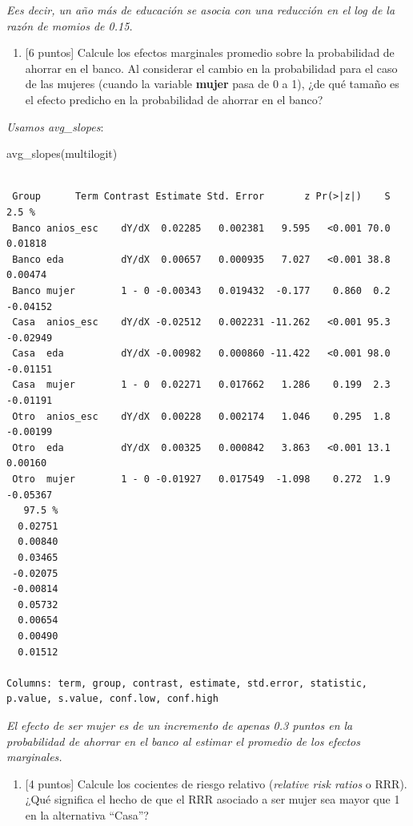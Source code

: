 \documentclass[
  letterpaper,
  DIV=11,
  numbers=noendperiod]{scrartcl}
\newenvironment{Shaded}{\begin{snugshade}}{\end{snugshade}}
\newcommand{\FunctionTok}[1]{\textcolor[rgb]{0.28,0.35,0.67}{#1}}
\newcommand{\NormalTok}[1]{\textcolor[rgb]{0.00,0.23,0.31}{#1}}
\providecommand{\tightlist}{%
  \setlength{\itemsep}{0pt}\setlength{\parskip}{0pt}}\usepackage{longtable,booktabs,array}
\begin{document}
\emph{Ees decir, un año más de educación se asocia con una reducción en
el log de la razón de momios de 0.15.}

\begin{enumerate}
\def\labelenumi{\alph{enumi}.}
\tightlist
\item
  {[}6 puntos{]} Calcule los efectos marginales promedio sobre la
  probabilidad de ahorrar en el banco. Al considerar el cambio en la
  probabilidad para el caso de las mujeres (cuando la variable
  \textbf{mujer} pasa de 0 a 1), ¿de qué tamaño es el efecto predicho en
  la probabilidad de ahorrar en el banco?
\end{enumerate}

\emph{Usamos avg\_slopes}:

\begin{Shaded}
\begin{Highlighting}[]
\FunctionTok{avg\_slopes}\NormalTok{(multilogit)}
\end{Highlighting}
\end{Shaded}

\begin{verbatim}

 Group      Term Contrast Estimate Std. Error       z Pr(>|z|)    S    2.5 %
 Banco anios_esc    dY/dX  0.02285   0.002381   9.595   <0.001 70.0  0.01818
 Banco eda          dY/dX  0.00657   0.000935   7.027   <0.001 38.8  0.00474
 Banco mujer        1 - 0 -0.00343   0.019432  -0.177    0.860  0.2 -0.04152
 Casa  anios_esc    dY/dX -0.02512   0.002231 -11.262   <0.001 95.3 -0.02949
 Casa  eda          dY/dX -0.00982   0.000860 -11.422   <0.001 98.0 -0.01151
 Casa  mujer        1 - 0  0.02271   0.017662   1.286    0.199  2.3 -0.01191
 Otro  anios_esc    dY/dX  0.00228   0.002174   1.046    0.295  1.8 -0.00199
 Otro  eda          dY/dX  0.00325   0.000842   3.863   <0.001 13.1  0.00160
 Otro  mujer        1 - 0 -0.01927   0.017549  -1.098    0.272  1.9 -0.05367
   97.5 %
  0.02751
  0.00840
  0.03465
 -0.02075
 -0.00814
  0.05732
  0.00654
  0.00490
  0.01512

Columns: term, group, contrast, estimate, std.error, statistic, p.value, s.value, conf.low, conf.high 
\end{verbatim}

\emph{El efecto de ser mujer es de un incremento de apenas 0.3 puntos en
la probabilidad de ahorrar en el banco al estimar el promedio de los
efectos marginales.}

\begin{enumerate}
\def\labelenumi{\alph{enumi}.}
\tightlist
\item
  {[}4 puntos{]} Calcule los cocientes de riesgo relativo
  (\emph{relative risk ratios} o RRR). ¿Qué significa el hecho de que el
  RRR asociado a ser mujer sea mayor que 1 en la alternativa ``Casa''?
\end{enumerate}
\end{document}
